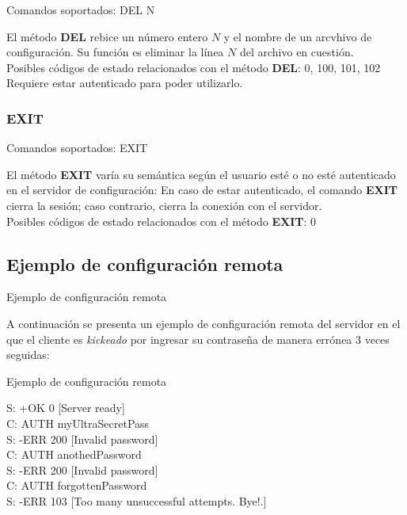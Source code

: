 \documentclass{beamer}
\begin{document}
\begin{frame}{Comandos soportados: DEL N}

\par El método \textbf{DEL} rebice un número entero $N$ y el nombre de un arcvhivo de configuración. Su función es eliminar la línea $N$ del archivo en cuestión. \\[0.5cm]
 Posibles códigos de estado relacionados con el método \textbf{DEL}: 0, 100, 101, 102
 Requiere estar autenticado para poder utilizarlo.
\end{frame}

\subsubsection{EXIT}

\begin{frame}{Comandos soportados: EXIT}

\par El método \textbf{EXIT} varía su semántica según el usuario esté o no esté autenticado en el servidor de configuración: En caso de estar autenticado, el comando \textbf{EXIT} cierra la sesión; caso contrario, cierra la conexión con el servidor.\\[0.5cm]
Posibles códigos de estado relacionados con el método \textbf{EXIT}: 0
\end{frame}

\subsection{Ejemplo de configuración remota}
\begin{frame}{Ejemplo de configuración remota}
\par A continuación se presenta un ejemplo de configuración remota del servidor en el que el cliente es \textit{kickeado} por ingresar su contraseña de manera errónea 3 veces seguidas:

\end{frame}

\begin{frame}[fragile]{Ejemplo de configuración remota}
\begin{block}{}
S: +OK 0 [Server ready]\\
C: AUTH myUltraSecretPass\\
S: -ERR 200 [Invalid password]\\
C: AUTH anothedPassword\\
S: -ERR 200 [Invalid password]\\
C: AUTH forgottenPassword\\
S: -ERR 103 [Too many unsuccessful attempts. Bye!.]
\end{block}
\end{frame}
\end{document}
